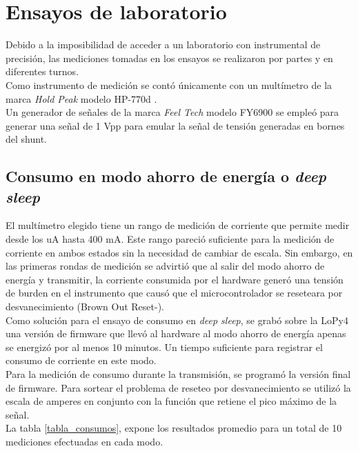 \section{Ensayos de laboratorio}
Debido a la imposibilidad de acceder a un laboratorio con instrumental de precisión, las mediciones tomadas en los ensayos se realizaron por partes y en diferentes turnos.\\
Como instrumento de medición se contó únicamente con un multímetro de la marca \textit{Hold Peak} modelo HP-770d \citep{hp770d}.\\
Un generador de señales de la marca \textit{Feel Tech} modelo FY6900 se empleó para generar una señal de 1 Vpp para emular la señal de tensión generadas en bornes del shunt.
\subsection{Consumo en modo ahorro de energía o \textit{deep sleep}}
El mult\'{i}metro elegido tiene un rango de medición de corriente que permite medir desde los uA hasta 400 mA. Este rango pareció suficiente para la medición de corriente en ambos estados sin la necesidad de cambiar de escala. Sin embargo, en las primeras rondas de medición se advirtió que al salir del modo ahorro de energía y transmitir, la corriente consumida por el hardware generó una tensión de burden en el instrumento que causó que el microcontrolador se reseteara por desvanecimiento (Brown Out Reset-).\\
Como solución para el ensayo de consumo en \textit{deep sleep}, se grabó sobre la LoPy4 una versión de firmware que llevó al hardware al modo ahorro de energía apenas se energizó por al menos 10 minutos. Un tiempo suficiente para registrar el consumo de corriente en este modo.\\
Para la medición de consumo durante la transmisión, se programó la versión final de firmware. Para sortear el problema de reseteo por desvanecimiento se utilizó la escala de amperes en conjunto con la función que retiene el pico máximo de la señal.\\
La tabla \ref{tabla_consumos}, expone los resultados promedio para un total de 10 mediciones efectuadas en cada modo.\\
